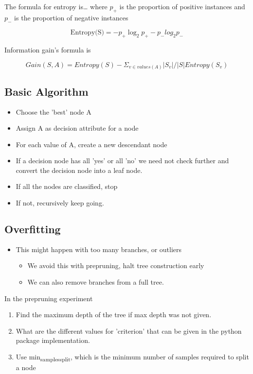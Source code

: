 \documentclass[11pt]{article}
\begin{document}
The formula for entropy is\ldots{} where \(p_+\) is the proportion of  positive instances and \(p_-\) is the proportion of negative instances

$$\text{Entropy(S)} = -p_+ \log_2p_+ - p_- log_2p_{-}$$

Information gain's formula is

$$Gain(S,A) = Entropy(S) - \Sigma_{v \in values(A)} |S_v| / |S| Entropy(S_v)$$
\subsection{Basic Algorithm}
\label{sec:org506631c}
\begin{itemize}
\item Choose the 'best' node A
\item Assign A as decision attribute for a node
\item For each value of A, create a new descendant node
\item If a decision node has all 'yes' or all 'no' we need not check further and convert the decision node into a leaf node.
\item If all the nodes are classified, stop
\item If not, recursively keep going.
\end{itemize}
\subsection{Overfitting}
\label{sec:orga350845}
\begin{itemize}
\item This might happen with too many branches, or outliers
\begin{itemize}
\item We avoid this with prepruning, halt tree construction early
\item We can also remove branches from a full tree.
\end{itemize}
\end{itemize}

In the prepruning experiment
\begin{enumerate}
\item Find the maximum depth of the tree if max depth was not given.
\item What are the different values for 'criterion' that can be given in the python package implementation.
\item Use min\textsubscript{samples}\textsubscript{split}, which is the minimum number of samples required to split a node
\end{enumerate}
\end{document}
